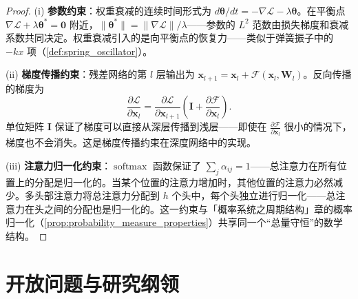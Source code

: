 \begin{proof}
(i) \textbf{参数约束}：权重衰减的连续时间形式为 $d\boldsymbol{\theta}/dt = -\nabla\mathcal{L} - \lambda \boldsymbol{\theta}$。在平衡点 $\nabla\mathcal{L} + \lambda \boldsymbol{\theta}^* = \mathbf{0}$ 附近，$\|\boldsymbol{\theta}^*\| = \|\nabla\mathcal{L}\|/\lambda$——参数的 $L^2$ 范数由损失梯度和衰减系数共同决定。权重衰减引入的是向平衡点的恢复力——类似于弹簧振子中的 $-kx$ 项（\cref{def:spring_oscillator}）。

(ii) \textbf{梯度传播约束}：残差网络的第 $l$ 层输出为 $\mathbf{x}_{l+1} = \mathbf{x}_l + \mathcal{F}(\mathbf{x}_l, \mathbf{W}_l)$。反向传播的梯度为
\[
\frac{\partial \mathcal{L}}{\partial \mathbf{x}_l} = \frac{\partial \mathcal{L}}{\partial \mathbf{x}_{l+1}} \left(\mathbf{I} + \frac{\partial \mathcal{F}}{\partial \mathbf{x}_l}\right).
\]
单位矩阵 $\mathbf{I}$ 保证了梯度可以直接从深层传播到浅层——即使在 $\frac{\partial \mathcal{F}}{\partial \mathbf{x}_l}$ 很小的情况下，梯度也不会消失。这是梯度传播约束在深度网络中的实现。

(iii) \textbf{注意力归一化约束}：$\operatorname{softmax}$ 函数保证了 $\sum_j \alpha_{ij} = 1$——总注意力在所有位置上的分配是归一化的。当某个位置的注意力增加时，其他位置的注意力必然减少。多头部注意力将总注意力分配到 $h$ 个头中，每个头独立进行归一化——总注意力在头之间的分配也是归一化的。这一约束与「概率系统之周期结构」章的概率归一化（\cref{prop:probability_measure_properties}）共享同一个“总量守恒”的数学结构。
\end{proof}

\section{开放问题与研究纲领}
\label{sec:agent_open_problems}

